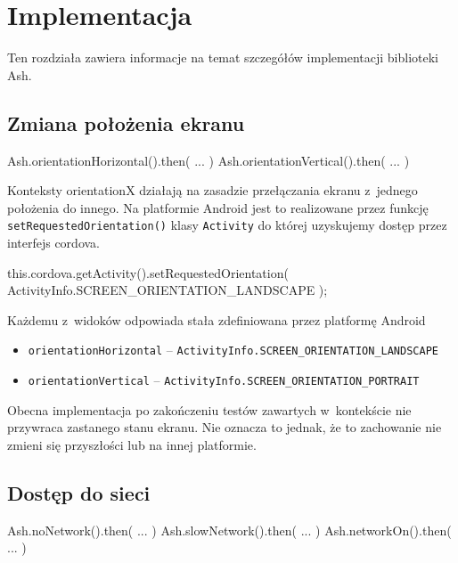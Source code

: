 \documentclass[brudnopis]{xmgr}
\begin{document}
\chapter{Implementacja}

Ten rozdziała zawiera informacje na temat szczegółów implementacji biblioteki Ash.

\section{Zmiana położenia ekranu}

\begin{javascriptcode}
  Ash.orientationHorizontal().then( ... )   
  Ash.orientationVertical().then( ... ) 
\end{javascriptcode}

Konteksty orientationX działają na zasadzie przełączania ekranu z~jednego położenia do innego. Na platformie Android jest to realizowane przez funkcję \texttt{setRequestedOrientation()} klasy \texttt{Activity} do której uzyskujemy dostęp przez interfejs cordova. 

\begin{javascriptcode}
this.cordova.getActivity().setRequestedOrientation(
  ActivityInfo.SCREEN_ORIENTATION_LANDSCAPE
);
\end{javascriptcode}

Każdemu z~widoków odpowiada stała zdefiniowana przez platformę Android
\begin{itemize}
  \item \texttt{orientationHorizontal} -- \texttt{ActivityInfo.SCREEN\_ORIENTATION\_LANDSCAPE}
  \item \texttt{orientationVertical} -- \texttt{ActivityInfo.SCREEN\_ORIENTATION\_PORTRAIT}
\end{itemize}

Obecna implementacja po zakończeniu testów zawartych w~kontekście nie przywraca zastanego stanu ekranu. Nie oznacza to jednak, że to zachowanie nie zmieni się przyszłości lub na innej platformie.

\section{Dostęp do sieci}

\begin{javascriptcode}
Ash.noNetwork().then( ... ) 
Ash.slowNetwork().then( ... ) 
Ash.networkOn().then( ... ) 
\end{javascriptcode}
\end{document}
